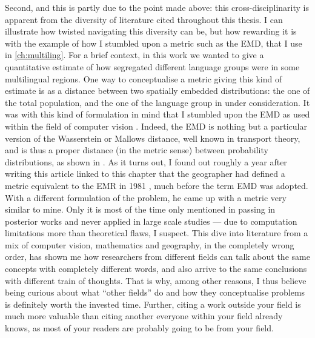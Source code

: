 \documentclass[../thesis.tex]{subfiles}
\begin{document}
Second, and this is partly due to the point made above: this cross-disciplinarity is
apparent from the diversity of literature cited throughout this thesis. I can illustrate
how twisted navigating this diversity can be, but how rewarding it is with the example
of how I stumbled upon a metric such as the \ac{EMD}, that I use in \cref{ch:multiling}.
For a brief context, in this work we wanted to give a quantitative estimate of how
segregated different language groups were in some multilingual regions. 
One way to conceptualise a metric giving this kind of estimate is as a distance between
two spatially embedded distributions: the one of the total population, and the one of
the language group in under consideration. 
It was with this kind of formulation in mind that I stumbled upon the \ac{EMD} as used
within the field of computer vision \cite{RubnerMetricDistributions1998}. Indeed, the
\ac{EMD} is nothing but a particular version of the Wasserstein or Mallows distance,
well known in transport theory, and is thus a proper distance (in the metric sense)
between probability distributions, as shown in \cite{LevinaEarthMover2001}. As it turns
out, I found out roughly a year after writing this article linked to this chapter that
the geographer  had defined a
metric equivalent to the \ac{EMR} in 1981 \cite{JakubsDistancebasedSegregation1981},
much before the term \ac{EMD} was adopted. With a different formulation of the problem,
he came up with a metric very similar to mine. Only it is most of the time only
mentioned in passing in posterior works and never applied in large scale studies --- due
to computation limitations more than theoretical flaws, I suspect. This dive into
literature from a mix of computer vision, mathematics and geography, in the completely
wrong order, has shown me how researchers from different fields can talk about the same
concepts with completely different words, and also arrive to the same conclusions with
different train of thoughts.
That is why, among other reasons, I thus believe being curious about what ``other
fields'' do and how they conceptualise problems is definitely worth the invested time.
Further, citing a work outside your field is much more valuable than citing another
everyone within your field already knows, as most of your readers are probably going to
be from your field.
\end{document}

